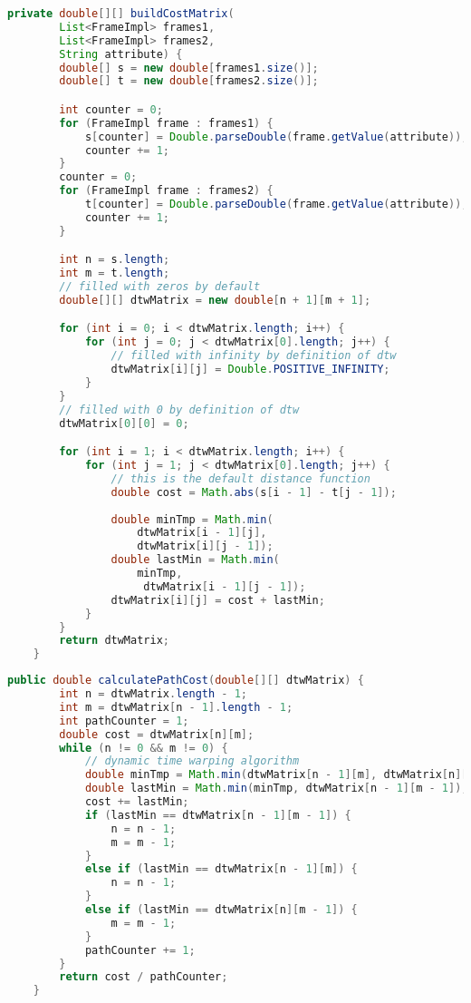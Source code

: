 \begin{lstlisting}[language=Java, caption=Kostenmatrix.]
    private double[][] buildCostMatrix(
        List<FrameImpl> frames1,
        List<FrameImpl> frames2,
        String attribute) {
        double[] s = new double[frames1.size()];
        double[] t = new double[frames2.size()];

        int counter = 0;
        for (FrameImpl frame : frames1) {
            s[counter] = Double.parseDouble(frame.getValue(attribute));
            counter += 1;
        }
        counter = 0;
        for (FrameImpl frame : frames2) {
            t[counter] = Double.parseDouble(frame.getValue(attribute));
            counter += 1;
        }

        int n = s.length;
        int m = t.length;
        // filled with zeros by default
        double[][] dtwMatrix = new double[n + 1][m + 1];

        for (int i = 0; i < dtwMatrix.length; i++) {
            for (int j = 0; j < dtwMatrix[0].length; j++) {
                // filled with infinity by definition of dtw
                dtwMatrix[i][j] = Double.POSITIVE_INFINITY;
            }
        }
        // filled with 0 by definition of dtw
        dtwMatrix[0][0] = 0;

        for (int i = 1; i < dtwMatrix.length; i++) {
            for (int j = 1; j < dtwMatrix[0].length; j++) {
                // this is the default distance function
                double cost = Math.abs(s[i - 1] - t[j - 1]);
                
                double minTmp = Math.min(
                    dtwMatrix[i - 1][j],
                    dtwMatrix[i][j - 1]);
                double lastMin = Math.min(
                    minTmp,
                     dtwMatrix[i - 1][j - 1]);
                dtwMatrix[i][j] = cost + lastMin;
            }
        }
        return dtwMatrix;
    }
\end{lstlisting}

\begin{lstlisting}[language=Java, caption=Warping Path berechnen.]
    public double calculatePathCost(double[][] dtwMatrix) {
        int n = dtwMatrix.length - 1;
        int m = dtwMatrix[n - 1].length - 1;
        int pathCounter = 1;
        double cost = dtwMatrix[n][m];
        while (n != 0 && m != 0) {
            // dynamic time warping algorithm
            double minTmp = Math.min(dtwMatrix[n - 1][m], dtwMatrix[n][m - 1]);
            double lastMin = Math.min(minTmp, dtwMatrix[n - 1][m - 1]);
            cost += lastMin;
            if (lastMin == dtwMatrix[n - 1][m - 1]) {
                n = n - 1;
                m = m - 1;
            }
            else if (lastMin == dtwMatrix[n - 1][m]) {
                n = n - 1;
            }
            else if (lastMin == dtwMatrix[n][m - 1]) {
                m = m - 1;
            }
            pathCounter += 1;
        }
        return cost / pathCounter;
    }
\end{lstlisting}

